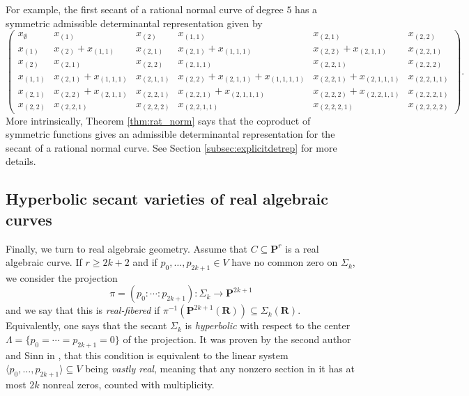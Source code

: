\documentclass[12pt]{amsart}
\numberwithin{equation}{section}
\numberwithin{thmcounter}{section}
\theoremstyle{definition}
\theoremstyle{claim}
\newcommand{\nR}{\mathbf{R}}
\newcommand{\nP}{\mathbf{P}}
\begin{document}
For example, the first secant of a rational normal curve of degree $5$ has a symmetric admissible determinantal representation given by
\[
\begin{pmatrix}
	x_{{\emptyset}} & x_{{(1)}} & x_{{(2)}} & x_{{(1,1)}} & x_{{(2,1)}} & x_{{(2,2)}} \\
	x_{{(1)}} & x_{{(2)}} + x_{{(1,1)}} & x_{{(2,1)}} & x_{{(2,1)}} + x_{{(1,1,1)}} & x_{{(2,2)}} + x_{{(2,1,1)}} & x_{{(2,2,1)}} \\
	x_{{(2)}} & x_{{(2,1)}} & x_{{(2,2)}} & x_{{(2,1,1)}} & x_{{(2,2,1)}} & x_{{(2,2,2)}} \\
	x_{{(1,1)}} & x_{{(2,1)}} + x_{{(1,1,1)}} & x_{{(2,1,1)}} & x_{{(2,2)}} + x_{{(2,1,1)}} + x_{{(1,1,1,1)}} & x_{{(2,2,1)}} + x_{{(2,1,1,1)}} & x_{{(2,2,1,1)}} \\
	x_{{(2,1)}} & x_{{(2,2)}} + x_{{(2,1,1)}} & x_{{(2,2,1)}} & x_{{(2,2,1)}} + x_{{(2,1,1,1)}} & x_{{(2,2,2)}} + x_{{(2,2,1,1)}} & x_{{(2,2,2,1)}} \\
	x_{{(2,2)}} & x_{{(2,2,1)}} & x_{{(2,2,2)}} & x_{{(2,2,1,1)}} & x_{{(2,2,2,1)}} & x_{{(2,2,2,2)}}
\end{pmatrix}.
\]
More intrinsically, Theorem \ref{thm:rat_norm} says that the coproduct of symmetric functions gives an admissible determinantal representation for the secant of a rational normal curve. See Section \ref{subsec:explicitdetrep} for more details.

\subsection{Hyperbolic secant varieties of real algebraic curves}

Finally, we turn to real algebraic geometry. Assume that $C\subseteq \nP^r$  is a real algebraic curve. If $r\geq 2k+2$ and if $p_0,\ldots,p_{2k+1}\in V$ have no common zero on $\Sigma_k$, we consider the projection
\begin{equation}\label{eq:real_projection} 
\pi = (p_0:\cdots:p_{2k+1})\colon \Sigma_k \longrightarrow \nP^{2k+1} 
\end{equation}
and we say that this is \emph{real-fibered} if $\pi^{-1}(\nP^{2k+1}(\nR)) \subseteq \Sigma_k(\nR)$. Equivalently, one says that the secant $\Sigma_k$ is \emph{hyperbolic} with respect to the center $\Lambda = \{p_0=\cdots=p_{2k+1}=0\}$ of the projection. It was proven by the second author and Sinn in \cite{kummersinn}, that this condition is equivalent to the linear system $\langle p_0,\ldots,p_{2k+1} \rangle \subseteq V$ being \emph{vastly real}, meaning that any nonzero section in it has at most $2k$ nonreal zeros, counted with multiplicity.
\end{document}
